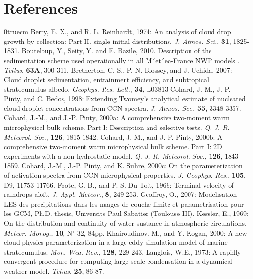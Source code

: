 \section{References}
\parindent 0truecm
\por
Berry, E. X., and R. L. Reinhardt, 1974: An analysis of cloud drop growth by
        collection: Part II. single initial distributions.
        {\it J. Atmos. Sci.},
        {\bf 31},
        1825-1831.
\por
Bouteloup, Y., Seity, Y. and E. Bazile, 2010. Description of the sedimentation scheme used operationally in all M´et´eo-France NWP models .
        {\it Tellus},
        {\bf 63A},
        300-311.
\por
Bretherton, C. S., P. N. Blossey, and J. Uchida, 2007: Cloud droplet sedimentation, entrainment efficiency,
           and subtropical stratocumulus albedo.
           {\it Geophys. Res. Lett.},
           {\bf 34,} 
           L03813
\por
Cohard, J.-M., J.-P. Pinty, and C. Bedos, 1998: Extending Twomey's analytical
        estimate of nucleated cloud droplet concentrations from CCN spectra.
        {\it J. Atmos. Sci.},
        {\bf 55,}
        3348-3357.
\por
Cohard, J.-M., and J.-P. Pinty, 2000a: A comprehensive two-moment warm
        microphysical bulk scheme. Part I: Description and selective tests.
        {\it Q. J. R. Meteorol. Soc.},
        {\bf 126},
        1815-1842.
\por
Cohard, J.-M., and J.-P. Pinty, 2000b: A comprehensive two-moment warm
        microphysical bulk scheme. Part I: 2D experiments with a
        non-hydrostatic model.
        {\it Q. J. R. Meteorol. Soc.},
        {\bf 126},
        1843-1859.
\por
Cohard, J.-M., J.-P. Pinty, and K. Suhre, 2000c: On the parameterization of
        activation spectra from CCN microphysical properties.
        {\it J. Geophys.  Res.},
        {\bf 105},
        D9,
        11753-11766.
\por
Foote, G. B., and P. S. Du Toit, 1969: Terminal velocity of raindrops aloft.
{\it J. Appl. Meteor.}, {\bf 8}, 249-253.
\por
Geoffroy, O., 2007: Modelisation LES des precipitations dans les nuages de couche limite et parametrisation pour les GCM, Ph.D. thesis, Universite Paul Sabatier (Toulouse III).
\por
Kessler, E., 1969: On the distribution and continuity of water sustance in
atmospheric circulations. {\it Meteor. Monog.}, {\bf 10}, N$^\circ$ 32, 84pp.
\por
Khairoudinov, M., and Y. Kogan, 2000: A new cloud physics parameterization
        in a large-eddy simulation model of marine stratocumulus.
        {\it Mon. Wea. Rev.},
        {\bf 128,}
        229-243.
\por
Langlois, W.E., 1973: A rapidly convergent procedure for computing large-scale
condensation in a dynamical weather model. {\it Tellus}, {\bf 25}, 86-87.

